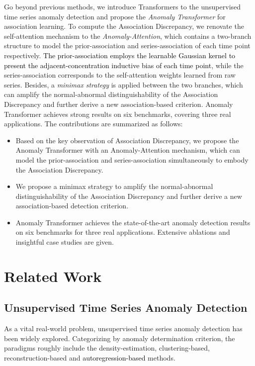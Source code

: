 \documentclass{article} %
\newcommand{\update}[1]{{\textcolor{black}{#1}}}
\begin{document}
Go beyond previous methods, we introduce Transformers to the unsupervised time series anomaly detection and propose the \textit{Anomaly Transformer} for association learning. To compute the Association Discrepancy, we renovate the self-attention mechanism to the \textit{Anomaly-Attention}, which contains a two-branch structure to model the prior-association and series-association of each time point respectively. \update{The prior-association employs the learnable Gaussian kernel to present the adjacent-concentration inductive bias of each time point}, while the series-association corresponds to the self-attention weights learned from raw series. Besides, a \emph{minimax strategy} is applied between the two branches, which can amplify the normal-abnormal distinguishability of the Association Discrepancy and further derive a new association-based criterion. Anomaly Transformer achieves strong results on six benchmarks, covering three real applications.
The contributions are summarized as follows:
\vspace{-5pt}
\begin{itemize}
  \item Based on the key observation of {Association Discrepancy}, we propose the {Anomaly Transformer} with an {Anomaly-Attention} mechanism, which can model the prior-association and series-association simultaneously to embody the Association Discrepancy.
  \item We propose a minimax strategy to amplify the normal-abnormal distinguishability of the Association Discrepancy and further derive a new association-based detection criterion.
  \item Anomaly Transformer achieves the state-of-the-art anomaly detection results on six benchmarks for three real applications. Extensive ablations and insightful case studies are given.
\end{itemize}

\vspace{-10pt}
\section{Related Work}
\vspace{-5pt}
\subsection{Unsupervised Time Series Anomaly Detection}
\vspace{-5pt}
As a vital real-world problem, unsupervised time series anomaly detection has been widely explored. Categorizing by anomaly determination criterion, the paradigms roughly include the density-estimation, clustering-based, reconstruction-based and \update{autoregression-based} methods.
\end{document}
